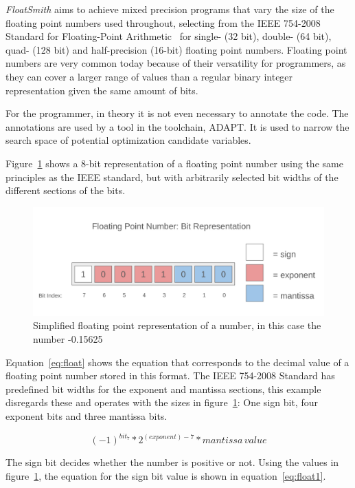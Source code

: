 \emph{FloatSmith} aims to achieve mixed precision programs that vary the size of the floating point numbers used throughout, selecting from the IEEE 754-2008 Standard for Floating-Point Arithmetic~\citep{ieee754} for single- (32 bit), double- (64 bit), quad- (128 bit) and half-precision (16-bit) floating point numbers. Floating point numbers are very common today because of their versatility for programmers, as they can cover a larger range of values than a regular binary integer representation given the same amount of bits.

For the programmer, in theory it is not even necessary to annotate the code. The annotations are used by a tool in the \floatsmith{} toolchain, ADAPT. It is used to narrow the search space of potential optimization candidate variables.

Figure~\ref{fig:float_bit_representation} shows a 8-bit representation of a floating point number using the same principles as the IEEE standard, but with arbitrarily selected bit widths of the different sections of the bits. 

\begin{figure}[h]
    \centering
    \includegraphics[width=0.75\linewidth]{Images/float_bit_representation.png}
    \caption{Simplified floating point representation of a number, in this case the number -0.15625}
    \label{fig:float_bit_representation}
\end{figure}

Equation~\ref{eq:float} shows the equation that corresponds to the decimal value of a floating point number stored in this format. The IEEE 754-2008 Standard has predefined bit widths for the exponent and mantissa sections, this example disregards these and operates with the sizes in figure~\ref{fig:float_bit_representation}: One sign bit, four exponent bits and three mantissa bits.

\begin{equation}\label{eq:float}
    (-1)^{bit_7} * 2^{(exponent) - 7} * mantissa \, value
\end{equation}

The sign bit decides whether the number is positive or not. Using the values in figure~\ref{fig:float_bit_representation}, the equation for the sign bit value is shown in equation~\ref{eq:float1}.

